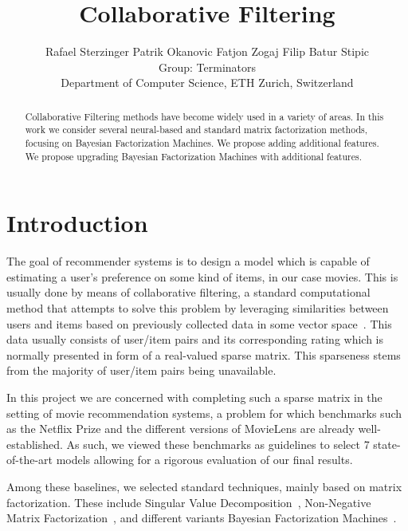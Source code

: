 \documentclass[10pt,conference,compsocconf]{IEEEtran}
\newcommand{\spacing}{\hspace{1cm}}
\begin{document}
    \title{Collaborative Filtering}

    \author{
    Rafael Sterzinger \spacing Patrik Okanovic \spacing Fatjon Zogaj \spacing Filip Batur Stipic\\
    Group: Terminators\\
    Department of Computer Science, ETH Zurich, Switzerland
    }

    \maketitle

    \begin{abstract}
        Collaborative Filtering methods have become widely used in a variety of areas. In this work we consider several neural-based and standard matrix factorization methods, focusing on Bayesian Factorization Machines. We propose adding additional features. We propose upgrading Bayesian Factorization Machines with additional features.

    \end{abstract}


    \section{Introduction}

    The goal of recommender systems is to design a model which is capable of estimating a user's preference on some kind of items, in our case movies.
    This is usually done by means of collaborative filtering, a standard computational method that attempts to solve this problem by leveraging similarities between users and items based on previously collected data in some vector space~\cite{CF_survey}.
    This data usually consists of user/item pairs and its corresponding rating which is normally presented in form of a real-valued sparse matrix.
    This sparseness stems from the majority of user/item pairs being unavailable.

    In this project we are concerned with completing such a sparse matrix in the setting of movie recommendation systems, a problem for which benchmarks such as the Netflix Prize \cite{Netflix} and the different versions of MovieLens \cite{Movielens} are already well-established.
    As such, we viewed these benchmarks as guidelines to select 7 state-of-the-art models allowing for a rigorous evaluation of our final results.

    Among these baselines, we selected standard techniques, mainly based on matrix factorization.
    These include Singular Value Decomposition~\cite{svd}, Non-Negative Matrix Factorization~\cite{6165290}, and different variants Bayesian Factorization Machines~\cite{freudenthaler_bayesian_2011, salakhutdinov_bayesian_2008}.
\end{document}
